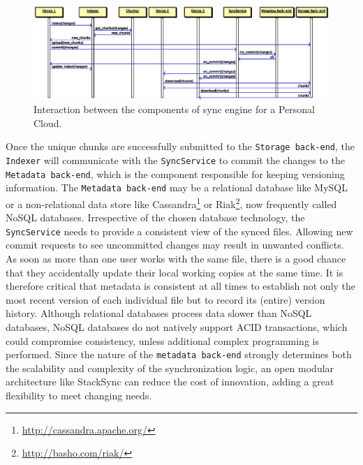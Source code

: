 \begin{figure}[t]
\centering
\includegraphics[width=\textwidth]{figures/stack}
\caption{Interaction between the components of sync engine for a Personal Cloud.}\label{fig:sequence}
\vspace{-10pt}
\end{figure}

Once the unique chunks are successfully submitted to the \texttt{Storage back-end}, 
the \texttt{Indexer} will communicate with the \texttt{SyncService} to commit the
changes to the \texttt{Metadata back-end}, which is the component responsible for
keeping versioning information. 
The \texttt{Metadata back-end} may be a relational
database like MySQL or a non-relational data store like Cassandra\footnote{\url{http://cassandra.apache.org/}}
or Riak\footnote{\url{http://basho.com/riak/}}, now frequently called NoSQL databases. Irrespective
of the chosen database technology, the \texttt{SyncService} needs to provide a consistent view of the synced files. 
Allowing new commit requests to see uncommitted changes may result in unwanted conflicts. As soon as more than one
user works with the same file, there is a good chance that they accidentally update their local working copies at
the same time. It is therefore critical that metadata is consistent at all times to establish not only the most
recent version of each individual file but to record its (entire) version history. Although relational databases process
data slower than NoSQL databases, NoSQL databases do not natively support ACID transactions, which could compromise
consistency, unless additional complex programming is performed. Since the nature of the \texttt{metadata back-end}
strongly determines both the scalability and complexity of the synchronization logic, an open modular architecture like StackSync
can reduce the cost of innovation, adding a great flexibility to meet changing needs.

